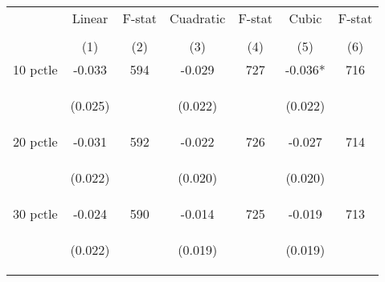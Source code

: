 \begin{tabular}{lcccccc}


\toprule


\multicolumn{1}{l}{} & \multicolumn{1}{c}{Linear} & \multicolumn{1}{c}{F-stat} & \multicolumn{1}{c}{Cuadratic} & \multicolumn{1}{c}{F-stat} & \multicolumn{1}{c}{Cubic} & \multicolumn{1}{c}{F-stat}  \\

\cmidrule(l{1mm}r{1mm}){2-3} \cmidrule(l{1mm}r{1mm}){4-5} \cmidrule(l{1mm}r{1mm}){6-7}   \\

 & (1) & (2) & (3) & (4) & (5) & (6)  \\ 
 

\hline

10 pctle   &  -0.033   &  594  &   -0.029  &  727 &  -0.036*  &  716 \\

\vspace{4pt} &  \begin{footnotesize}(0.025)\end{footnotesize}   & &
			    \begin{footnotesize}(0.022)\end{footnotesize}   & &
			    \begin{footnotesize}(0.022)\end{footnotesize}   & 
			     \\          


20 pctle   &  -0.031   &  592  &   -0.022  &  726 &  -0.027  &  714   \\

\vspace{4pt} &  \begin{footnotesize}(0.022)\end{footnotesize}   & &
			    \begin{footnotesize}(0.020)\end{footnotesize}   & &
			    \begin{footnotesize}(0.020)\end{footnotesize}   &
			     \\          


30 pctle   &  -0.024   &  590  &   -0.014  &  725 &  -0.019  &  713   \\


\vspace{4pt} &  \begin{footnotesize}(0.022)\end{footnotesize}   & &
			    \begin{footnotesize}(0.019)\end{footnotesize}   & &
			    \begin{footnotesize}(0.019)\end{footnotesize}   &
			     \\          




\end{tabular}
